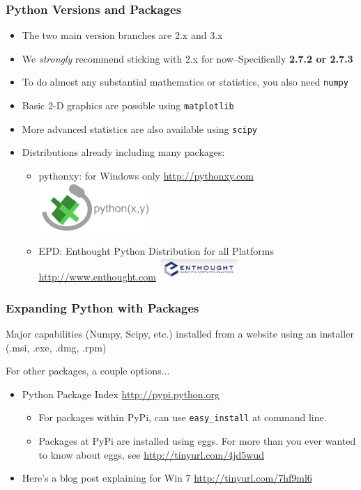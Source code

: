 \documentclass{beamer}
\begin{document}
\begin{frame}[fragile]
\frametitle{Python Versions and Packages}
\begin{itemize}
\item{The two main version branches are 2.x and 3.x}
\item{We \emph{strongly} recommend sticking with 2.x \newline{}for now--Specifically \bf{2.7.2} or \bf{2.7.3}}
\item{To do almost any substantial mathematics or statistics, you also need \texttt{numpy}}
\item{Basic 2-D graphics are possible using \texttt{matplotlib}}
\item{More advanced statistics are also available using \texttt{scipy}}
\item{Distributions already including many packages:}
\begin{itemize}
\item {pythonxy: for Windows only \url{http://pythonxy.com}\includegraphics[scale=0.4]{figures/pythonxy.png}}
\item {EPD: Enthought Python Distribution for all Platforms \url{http://www.enthought.com}
\includegraphics[width=3cm,height=.86cm]{figures/enthought.png}}
\end{itemize}
\end{itemize}
\end{frame}

\begin{frame}[fragile]
\frametitle{Expanding Python with Packages}

Major capabilities (Numpy, Scipy, etc.) installed from a website using an installer (.msi, .exe, .dmg, .rpm)

For other packages, a couple options...
\begin{itemize}
\item Python Package Index \url{http://pypi.python.org}
\begin{itemize}
\item {For packages within PyPi, can use \texttt{easy\_install} at command line.}
\item {Packages at PyPi are installed using eggs. For more than you ever wanted to
 know about eggs, see \url{http://tinyurl.com/4jd5wud}}
\end{itemize}
\item Here's a blog post explaining for Win 7 \url{http://tinyurl.com/7hf9ml6}
\end{itemize}
\end{frame}
\end{document}
